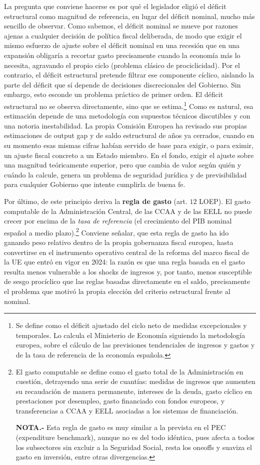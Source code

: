 \documentclass[10pt,a4paper]{article}
\begin{document}
La pregunta que conviene hacerse es por qué el legislador eligió el déficit estructural como magnitud de referencia, en lugar del déficit nominal, mucho más sencillo de observar. Como sabemos, el déficit nominal se mueve por razones ajenas a cualquier decisión de política fiscal deliberada, de modo que exigir el mismo esfuerzo de ajuste sobre el déficit nominal en una recesión que en una expansión obligaría a recortar gasto precisamente cuando la economía más lo necesita, agravando el propio ciclo (problema clásico de prociclicidad). Por el contrario, el déficit estructural pretende filtrar ese componente cíclico, aislando la parte del déficit que sí depende de decisiones discrecionales del Gobierno. Sin embargo, esto esconde un problema práctico de primer orden. El déficit estructural no se observa directamente, sino que se estima.\footnote{%
    Se define como el déficit ajustado del ciclo neto de medidas excepcionales y temporales. Lo calcula el Ministerio de Economía siguiendo la metodología europea, sobre el cálculo de las previsiones tendenciales de ingresos y gastos y de la tasa de referencia de la economía española.
} Como es natural, esa estimación depende de una metodología con supuestos técnicos discutibles y con una notoria inestabilidad. La propia Comisión Europea ha revisado sus propias estimaciones de output gap y de saldo estructural de años ya cerrados, cuando en su momento esas mismas cifras habían servido de base para exigir, o para eximir, un ajuste fiscal concreto a un Estado miembro. En el fondo, exigir el ajuste sobre una magnitud teóricamente superior, pero que cambia de valor según quién y cuándo la calcule, genera un problema de seguridad jurídica y de previsibilidad para cualquier Gobierno que intente cumplirla de buena fe.

Por último, de este principio deriva la \textbf{regla de gasto} (art. $12$ LOEP). El gasto computable de la Administración Central, de las CCAA y de las EELL no puede crecer por encima de la \textit{tasa de referencia} (el crecimiento del PIB nominal español a medio plazo).\footnote{%
    El gasto computable se define como el gasto total de la Administración en cuestión, detrayendo una serie de cuantías: medidas de ingresos que aumenten su recaudación de manera permanente, intereses de la deuda, gasto cíclico en prestaciones por desempleo, gasto financiado con fondos europeos, y transferencias a CCAA y EELL asociadas a los sistemas de financiación.

\textbf{NOTA.-} Esta regla de gasto es muy similar a la prevista en el PEC (expenditure benchmark), aunque no es del todo idéntica, pues afecta a todos los subsectores sin excluir a la Seguridad Social, resta los oneoffs y suaviza el gasto en inversión, entre otras divergencias.
} Conviene señalar, que esta regla de gasto ha ido ganando peso relativo dentro de la propia gobernanza fiscal europea, hasta convertirse en el instrumento operativo central de la reforma del marco fiscal de la UE que entró en vigor en 2024: la razón es que una regla basada en el gasto resulta menos vulnerable a los shocks de ingresos y, por tanto, menos susceptible de sesgo procíclico que las reglas basadas directamente en el saldo, precisamente el problema que motivó la propia elección del criterio estructural frente al nominal.
\end{document}

